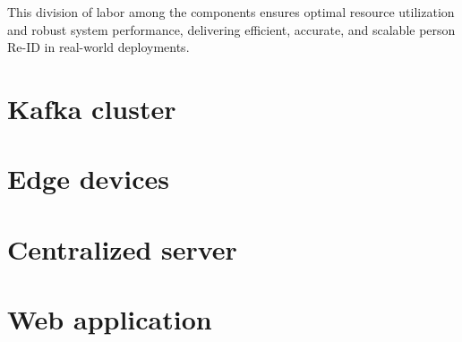 \documentclass[../main.tex]{subfiles}
\begin{document}
This division of labor among the components ensures optimal resource utilization and robust system performance, delivering efficient, accurate, and scalable person Re-ID in real-world deployments.


\section{Kafka cluster}
\label{sec:kafka_cluster}



\section{Edge devices}
\label{sec:edge_devices}


\section{Centralized server}
\label{sec:centralized_server}


\section{Web application}
\end{document}
